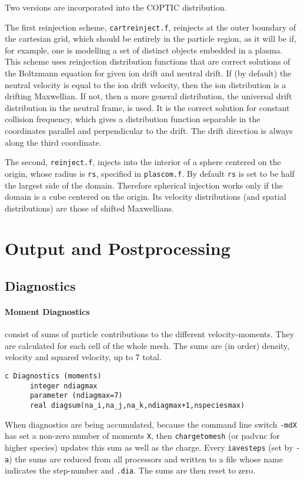 \documentclass[12pt]{article}
\begin{document}
Two versions are incorporated into the COPTIC distribution. 

The first reinjection scheme,
\verb!cartreinject.f!, reinjects at the outer boundary of the
cartesian grid, which should be entirely in the particle region, as it
will be if, for example, one is modelling a set of distinct objects
embedded in a plasma. This scheme uses reinjection distribution
functions that are correct solutions of the Boltzmann equation for
given ion drift and neutral drift. If (by default) the neutral
velocity is equal to the ion drift velocity, then the ion distribution
is a drifting Maxwellian. If not, then a more general distribution,
the universal drift distribution in the neutral frame, is used. It is
the correct solution for constant collision frequency, which gives a
distribution function separable in the coordinates parallel and
perpendicular to the drift. The drift direction is always along the
third coordinate.

The second, \verb!reinject.f!, injects into the
interior of a sphere centered on the origin, whose radius is
\verb!rs!, specified in \verb!plascom.f!. By default \verb!rs! is set
to be half the largest side of the domain. Therefore spherical
injection works only if the domain is a cube centered on the origin.
Its velocity distributions (and spatial distributions) are those of
shifted Maxwellians.

\section{Output and Postprocessing}

\subsection{Diagnostics}

\paragraph{Moment Diagnostics} consist of sums of particle
contributions to the different velocity-moments. They are calculated
 for each cell of the whole mesh. The sums are (in order) density,
 velocity and squared velocity, up to 7 total.
\begin{verbatim}
c Diagnostics (moments)
      integer ndiagmax
      parameter (ndiagmax=7)
      real diagsum(na_i,na_j,na_k,ndiagmax+1,nspeciesmax)
\end{verbatim}
 When diagnostics are being accumulated, because the command line
 switch \verb!-mdX! has set a non-zero number of moments \verb!X!,
 then \verb!chargetomesh! (or padvnc for higher species) updates this
 sum as well as the charge. Every \verb!iavesteps! (set by \verb!-a!)
 the sums are reduced from all processors and written to a file whose
 name indicates the step-number and \verb!.dia!. The sums are then
 reset to zero.
\end{document}

